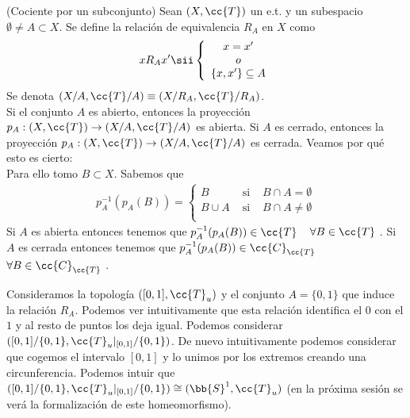 \begin{ejemplo}(Cociente por un subconjunto)
    Sean $(X, \cc{T})$ un e.t. y un subespacio $\emptyset \neq A \subset X$. Se define la relación de equivalencia $R_A$ en $X$ como 
    \begin{align*}
        xR_A x' \sii \left\{
        \begin{array}{c}
            x=x'\\
            o\\
            \{x,x'\}\subseteq A\\
        \end{array}
        \right.
    \end{align*}
    Se denota $(X/A, \cc{T}/A)\equiv (X/R_A, \cc{T}/R_A)$.\\

    Si el conjunto $A$ es abierto, entonces la proyección $p_A:(X, \cc{T})\to (X/A, \cc{T}/A)$ es abierta. Si $A$ es cerrado, entonces la proyección $p_A:(X, \cc{T})\to (X/A, \cc{T}/A)$ es cerrada. Veamos por qué esto es cierto:\\

    Para ello tomo $B\subset X$. Sabemos que \begin{align*}
        p_A^{-1}(p_A(B)) = \left\{
            \begin{array}{ccc}
                B & \text{ si } & B\cap A = \emptyset\\
                B\cup A & \text{ si } & B\cap A \neq \emptyset\\
            \end{array}
            \right.
    \end{align*}
    Si $A$ es abierta entonces tenemos que $p_A^{-1}(p_A(B))\in \cc{T}$\ \ $\forall B \in \cc{T}$ . Si $A$ es cerrada entonces tenemos que $p_A^{-1}(p_A(B))\in \cc{C}_{\cc{T}}$\ \ $\forall B \in \cc{C}_{\cc{T}}$ . 
    \endsquare
\end{ejemplo}

\begin{ejemplo}
    Consideramos la topología $([0,1], \cc{T}_u)$ y el conjunto $A=\{0,1\}$ que induce la relación $R_A$. Podemos ver intuitivamente que esta relación identifica el $0$ con el $1$ y al resto de puntos los deja igual. Podemos considerar $([0,1]/\{0,1\}, \cc{T}_u|_{[0,1]}/\{0,1\})$. De nuevo intuitivamente podemos considerar que cogemos el intervalo $[0,1]$ y lo unimos por los extremos creando una circunferencia. Podemos intuir que  $([0,1]/\{0,1\}, \cc{T}_u|_{[0,1]}/\{0,1\}) \cong (\bb{S}^1, \cc{T}_u)$ (en la próxima sesión se verá la formalización de este homeomorfismo).
    \endsquare
\end{ejemplo}

